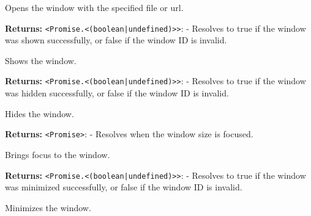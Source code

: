\documentclass[12pt,a4paper]{article}
\begin{document}
\noindent Opens the window with the specified file or url.

\vspace{5mm}
\noindent {}


\noindent \textbf{Returns:} \texttt{<Promise.<(boolean|undefined)>>}: - Resolves to \textasciigrave{}true\textasciigrave{} if the window was shown successfully, or \textasciigrave{}false\textasciigrave{} if the window ID is invalid.

\noindent Shows the window.

\vspace{5mm}
\noindent {}


\noindent \textbf{Returns:} \texttt{<Promise.<(boolean|undefined)>>}: - Resolves to \textasciigrave{}true\textasciigrave{} if the window was hidden successfully, or \textasciigrave{}false\textasciigrave{} if the window ID is invalid.

\noindent Hides the window.

\vspace{5mm}
\noindent {}


\noindent \textbf{Returns:} \texttt{<Promise>}: - Resolves when the window size is focused.

\noindent Brings focus to the window.

\vspace{5mm}
\noindent {}


\noindent \textbf{Returns:} \texttt{<Promise.<(boolean|undefined)>>}: - Resolves to \textasciigrave{}true\textasciigrave{} if the window was minimized successfully, or \textasciigrave{}false\textasciigrave{} if the window ID is invalid.

\noindent Minimizes the window.

\vspace{5mm}
\noindent {}
\end{document}
